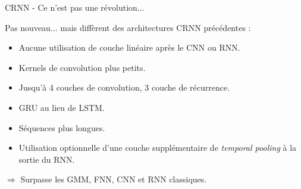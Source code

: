 \documentclass[compress,xcolor=table]{beamer}
\begin{document}
\begin{frame}{CRNN - Ce n'est pas une révolution...}

    Pas nouveau... mais diffèrent des architectures CRNN précédentes :

    \begin{exampleblock}{\cite{cakirConvolutionalRecurrentNeural2017a}}

        \begin{itemize}
            \item Aucune utilisation de couche linéaire après le CNN ou RNN.
            \item Kernels de convolution plus petits.
            \item Jusqu'à 4 couches de convolution, 3 couche de récurrence.
            \item GRU au lieu de LSTM.
            \item Séquences plus longues.
            \item Utilisation optionnelle d'une couche supplémentaire de \textit{temporal pooling} à la sortie du RNN.
        \end{itemize}

    \end{exampleblock}

    $\Rightarrow$ Surpasse les GMM, FNN, CNN et RNN classiques.

\end{frame}
\end{document}
